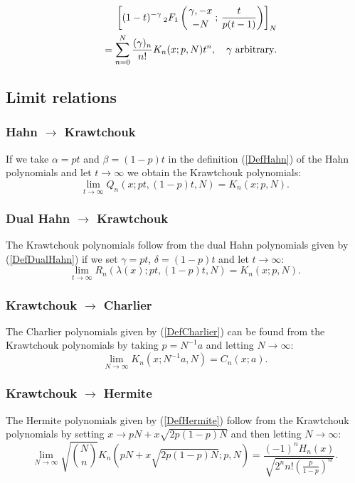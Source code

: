 \documentclass[envcountchap,graybox]{svmono}
\newcounter{rom}
\newcommand{\hyp}[5]{\mbox{}_{#1}{F}_{#2}
\left(\genfrac{}{}{0pt}{}{#3}{#4}\,;\,#5\right)}
\newcommand{\hyp}[5]{\,\mbox{}_{#1}F_{#2}\!\left(
  \genfrac{}{}{0pt}{}{#3}{#4};#5\right)}
\begin{document}
\begin{eqnarray}
\label{GenKrawtchouk3}
& &\left[(1-t)^{-\gamma}\,\hyp{2}{1}{\gamma,-x}{-N}{\frac{t}{p(t-1)}}\right]_N\nonumber\\
& &{}=\sum_{n=0}^N\frac{(\gamma)_n}{n!}K_n(x;p,N)t^n,
\quad\textrm{$\gamma$ arbitrary}.
\end{eqnarray}

\subsection*{Limit relations}

\subsubsection*{Hahn $\rightarrow$ Krawtchouk}
If we take $\alpha=pt$ and $\beta=(1-p)t$ in the definition (\ref{DefHahn}) of the Hahn
polynomials and let $t\rightarrow\infty$ we obtain the Krawtchouk polynomials:
$$\lim_{t\rightarrow\infty}Q_n(x;pt,(1-p)t,N)=K_n(x;p,N).$$

\subsubsection*{Dual Hahn $\rightarrow$ Krawtchouk}
The Krawtchouk polynomials follow from the dual Hahn polynomials given by
(\ref{DefDualHahn}) if we set $\gamma=pt$, $\delta=(1-p)t$ and let $t\rightarrow\infty$:
$$\lim_{t\rightarrow\infty}R_n(\lambda(x);pt,(1-p)t,N)=K_n(x;p,N).$$

\subsubsection*{Krawtchouk $\rightarrow$ Charlier}
The Charlier polynomials given by (\ref{DefCharlier}) can be found from the Krawtchouk
polynomials by taking $p=N^{-1}a$ and letting $N\rightarrow\infty$:
\begin{equation}
\lim_{N\rightarrow\infty}K_n(x;N^{-1}a,N)=C_n(x;a).
\end{equation}

\subsubsection*{Krawtchouk $\rightarrow$ Hermite}
The Hermite polynomials given by (\ref{DefHermite}) follow from the Krawtchouk polynomials
by setting $x\rightarrow pN+x\sqrt{2p(1-p)N}$ and then letting $N\rightarrow\infty$:
\begin{equation}
\lim_{N\rightarrow\infty}
\sqrt{\binom{N}{n}}K_n(pN+x\sqrt{2p(1-p)N};p,N)
=\frac{\displaystyle (-1)^nH_n(x)}{\displaystyle\sqrt{2^nn!\left(\frac{p}{1-p}\right)^n}}.
\end{equation}
\end{document}
